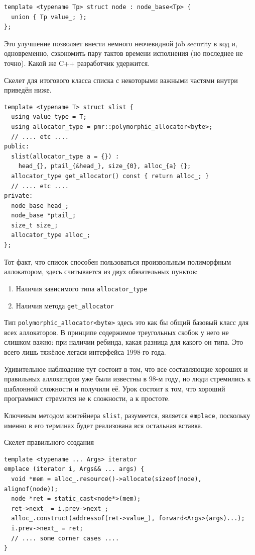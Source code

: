 \documentclass[a4paper,12pt,oneside]{book}
\begin{document}
\begin{lstlisting}
template <typename Tp> struct node : node_base<Tp> {
  union { Tp value_; };
};
\end{lstlisting}

Это улучшение позволяет внести немного неочевидной job security в код и, одновременно, сэкономить пару тактов времени исполнения (но последнее не точно). Какой же C++ разработчик удержится.

Скелет для итогового класса списка с некоторыми важными частями внутри приведён ниже.

\begin{lstlisting}
template <typename T> struct slist { 
  using value_type = T;
  using allocator_type = pmr::polymorphic_allocator<byte>;
  // .... etc ....
public:
  slist(allocator_type a = {}) : 
    head_{}, ptail_{&head_}, size_{0}, alloc_{a} {};
  allocator_type get_allocator() const { return alloc_; }
  // .... etc ....
private:
  node_base head_;
  node_base *ptail_;
  size_t size_;
  allocator_type alloc_;
};
\end{lstlisting}

Тот факт, что список способен пользоваться произвольным полиморфным аллокатором, здесь считывается из двух обязательных пунктов:

\begin{enumerate}
\item Наличия зависимого типа \lstinline!allocator_type!
\item Наличия метода \lstinline!get_allocator! 
\end{enumerate}

Тип \lstinline!polymorphic_allocator<byte>! здесь это как бы общий базовый класс для всех аллокаторов. В принципе содержимое треугольных скобок у него не слишком важно: при наличии ребинда, какая разница для какого он типа. Это всего лишь тяжёлое легаси интерфейса 1998-го года.

Удивительное наблюдение тут состоит в том, что все составляющие хороших и правильных аллокаторов уже были известны в 98-м году, но люди стремились к шаблонной сложности и получили её. Урок состоит к том, что хороший программист стремится не к сложности, а к простоте.

Ключевым методом контейнера \lstinline!slist!, разумеется, является \lstinline!emplace!, поскольку именно в его терминах будет реализована вся остальная вставка.

Скелет правильного создания 

\begin{lstlisting}
template <typename ... Args> iterator
emplace (iterator i, Args&& ... args) {
  void *mem = alloc_.resource()->allocate(sizeof(node), alignof(node));
  node *ret = static_cast<node*>(mem);
  ret->next_ = i.prev->next_;
  alloc_.construct(addressof(ret->value_), forward<Args>(args)...);
  i.prev->next_ = ret;
  // .... some corner cases .... 
}
\end{lstlisting}
\end{document}
